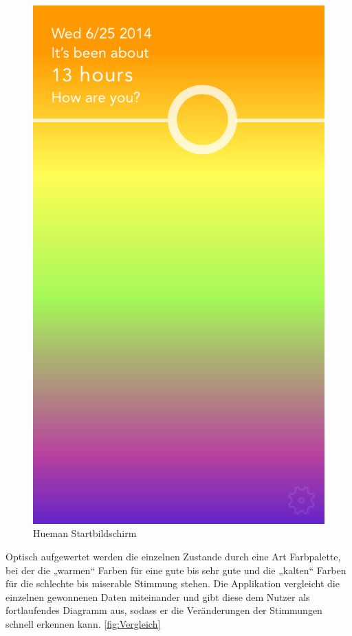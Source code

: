 \begin{figure}[H]
	\centering
	\includegraphics[scale=0.3]{images/hueman-app-main-ui.PNG}
	\caption{Hueman Startbildschirm \cite{fig:HUI}}
	\label{fig:HUI}
\end{figure}

Optisch aufgewertet werden die einzelnen Zustande durch eine Art Farbpalette, bei der die „warmen“ Farben für eine gute bis sehr gute und die „kalten“ Farben für die schlechte bis miserable Stimmung stehen\cite{web:Human}. 
Die Applikation vergleicht die einzelnen gewonnenen Daten miteinander und gibt diese dem Nutzer als fortlaufendes Diagramm aus, sodass er die Veränderungen der Stimmungen schnell erkennen kann.
\ref{fig:Vergleich}


